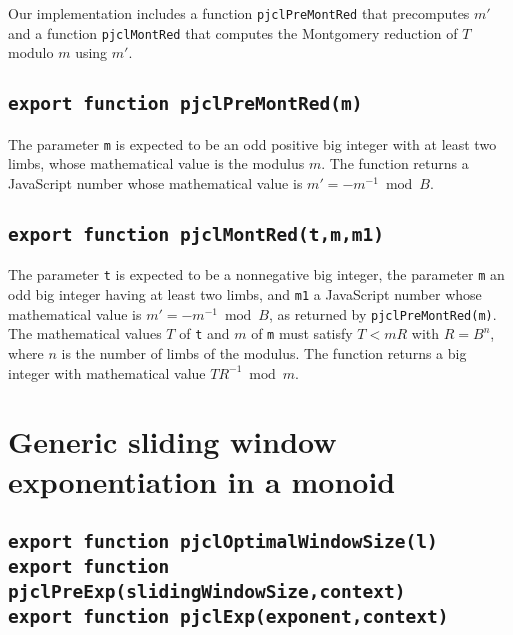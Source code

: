 \documentclass[12pt]{article}
\begin{document}
Our implementation includes a function {\tt pjclPreMontRed} that
precomputes $m'$ and a function {\tt pjclMontRed} that computes the
Montgomery reduction of $T$ modulo $m$ using $m'$.

\subsection{\tt export function pjclPreMontRed(m)}

The parameter {\tt m} is expected to be an odd positive big integer
with at least two limbs, whose mathematical value is the modulus $m$.
The function returns a JavaScript number whose mathematical value is
$m' = -m^{-1} \bmod B$.

\subsection{\tt export function pjclMontRed(t,m,m1)}

The parameter {\tt t} is expected to be a nonnegative big integer, 
the parameter {\tt m} an odd big integer having at least two limbs,
and {\tt m1} a JavaScript number whose mathematical value is $m' = -m^{-1} \bmod B$,
as returned by {\tt pjclPreMontRed(m)}.
The mathematical values $T$ of {\tt t} and $m$ of {\tt m} must satisfy
$T < mR$ with $R = B^n$, where $n$ is the number of limbs of the
modulus.  The function returns a big integer with mathematical value
$TR^{-1} \bmod m$.

\section{Generic sliding window exponentiation in a monoid}

\subsection{\tt export function pjclOptimalWindowSize(l)\\export function pjclPreExp(slidingWindowSize,context)\\export function pjclExp(exponent,context)}
\label{s:exp}
\end{document}

